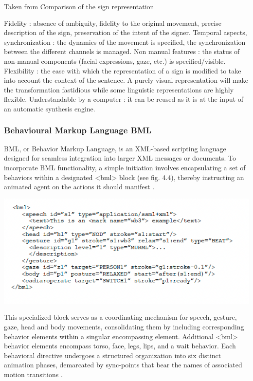 \begin{landscape}
\begin{table}[h]
     \caption{Taken from \parencite{naert2020survey} Comparison of the sign representation}
     \label{tab:visualrepresentations}
 \end{table}
\end{landscape}

Fidelity : absence of ambiguity, fidelity to the original movement, precise description of the sign, preservation of the intent of the signer. Temporal aspects, synchronization : the dynamics of the movement is specified, the synchronization between the different channels is managed. Non manual features : the status of non-manual components (facial expressions, gaze, etc.) is specified/visible. Flexibility : the ease with which the representation of a sign is modified to take into account the context of the sentence. A purely visual representation will make the transformation fastidious while some linguistic representations are highly flexible. Understandable by a computer : it can be reused as it is at the input of an automatic synthesis engine. 


\subsubsection{Behavioural Markup Language BML}

BML, or Behavior Markup Language, is an XML-based scripting language designed for seamless integration into larger XML messages or documents. To incorporate BML functionality, a simple initiation involves encapsulating a set of behaviors within a designated <bml> block (see fig. 4.4), thereby instructing an animated agent on the actions it should manifest \parencite{vilhjalmsson2007behavior}.

\includegraphics[width=\textwidth]{figures/bml-example.png}

This specialized block serves as a coordinating mechanism for speech, gesture, gaze, head and body movements, consolidating them by including corresponding behavior elements within a singular encompassing element. Additional <bml> behavior elements encompass torso, face, legs, lips, and a wait behavior. Each behavioral directive undergoes a structured organization into six distinct animation phases, demarcated by sync-points that bear the names of associated motion transitions \parencite{vilhjalmsson2007behavior}.

